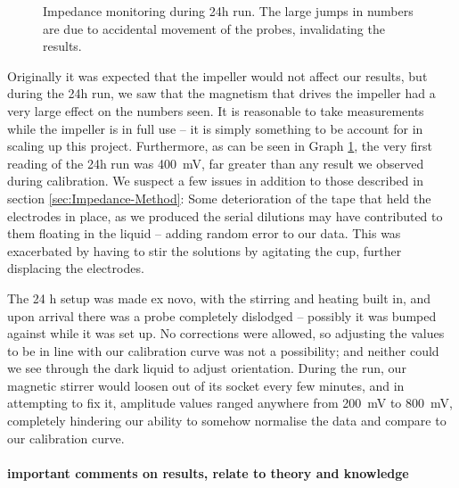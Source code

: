 \begin{figure}[h!] %
    \centering
    \caption{Impedance monitoring during 24h run. The large jumps in numbers are due to accidental movement of the probes, invalidating the results.}
    \label{gr:24hImpedance}
\end{figure}
Originally it was expected that the impeller would not affect our results, but during the 24h run, we saw that the magnetism that drives the impeller had a very large effect on the numbers seen.
It is reasonable to take measurements while the impeller is in full use -- it is simply something to be account for in scaling up this project. 
Furthermore, as can be seen in Graph \ref{gr:24hImpedance}, the very first reading of the 24h run was \SI{400}{\milli\volt}, far greater than any result we observed during calibration.
We suspect a few issues in addition to those described in section \ref{sec:Impedance-Method}: Some deterioration of the tape that held the electrodes in place, as we produced the serial dilutions may have contributed to them floating in the liquid -- adding random error to our data.
This was exacerbated by having to stir the solutions by agitating the cup, further displacing the electrodes.

The 24 h setup was made ex novo, with the stirring and heating built in, and upon arrival there was a probe completely dislodged -- possibly it was bumped against while it was set up. No corrections were allowed, so adjusting the values to be in line with our calibration curve was not a possibility; and neither could we see through the dark liquid to adjust orientation. During the run, our magnetic stirrer would loosen out of its socket every few minutes, and in attempting to fix it, amplitude values ranged anywhere from \SI{200}{\milli\volt} to \SI{800}{\milli\volt}, completely hindering our ability to somehow normalise the data and compare to our calibration curve.

\paragraph{important comments on results, relate to theory and knowledge}